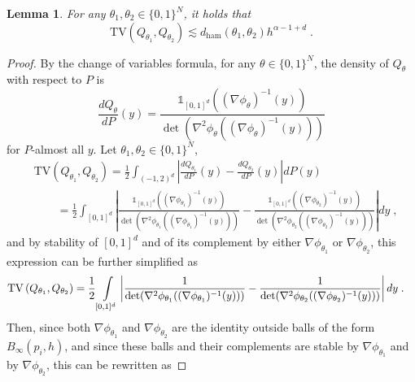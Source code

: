 \documentclass{article}
\theoremstyle{plain}
\newtheorem{lemma}[theorem]{Lemma}
\theoremstyle{definition}
\theoremstyle{remark}
\newcommand{\Ind}[0]{\mathds{1}}
\newcommand\tv[2]{\mathrm{TV}\left( {#1}, {#2} \right)}
\newcommand\ham[2]{d_\mathrm{ham}\left( {#1}, {#2} \right)}
\begin{document}
    \begin{lemma}
    \label{lemma:tvpacking}
    For any $\theta_1, \theta_2 \in \{0, 1 \}^{N}$, it holds that
    \begin{equation}
        \tv{Q_{\theta_1}}{Q_{\theta_2}}
        \lesssim \ham{\theta_1}{\theta_2} h^{\alpha - 1 + d} \;.
    \end{equation}
\end{lemma}
\begin{proof}
By the change of variables formula, for any $\theta \in \{0, 1 \}^{N}$, the density of $Q_{\theta}$  with respect to $P$ is
\begin{equation}
    \frac{d Q_{\theta}}{dP}(y) = \frac{\Ind_{[0, 1]^d} ((\nabla \phi_{\theta})^{-1}(y))}{\det(\nabla^2 \phi_{\theta}((\nabla \phi_{\theta})^{-1}(y)))}
\end{equation}
for $P$-almost all $y$. 
Let $\theta_1, \theta_2\in \{0, 1 \}^{N}$,
\begin{equation}
    \begin{aligned}
        &\tv{Q_{\theta_1}}{Q_{\theta_2}}
        = 
        \frac{1}{2} \int_{(-1,2)^d} \left| \frac{d Q_{\theta_1}}{dP}(y) - \frac{d Q_{\theta_2}}{dP}(y) \right| dP(y) \\
        &\quad\quad= 
        \frac{1}{2} \int_{[0, 1]^d} \left| \frac{\Ind_{[0, 1]^d} ((\nabla \phi_{\theta_1})^{-1}(y))}{\det(\nabla^2 \phi_{\theta_1}((\nabla \phi_{\theta_1})^{-1}(y)))} - \frac{\Ind_{[0, 1]^d} ((\nabla \phi_{\theta_2})^{-1}(y))}{\det(\nabla^2 \phi_{\theta_2}((\nabla \phi_{\theta_2})^{-1}(y)))} \right| dy \;,
    \end{aligned}
\end{equation}
and by stability of $[0, 1]^d$ and of its complement by either $\nabla \phi_{\theta_1}$ or $\nabla \phi_{\theta_2}$, this expression can be further simplified as 
\begin{equation}
    \begin{aligned}
        &\tv{Q_{\theta_1}}{Q_{\theta_2}} 
        = \frac{1}{2} \int \displaylimits_{[0, 1]^d} \left| \frac{1}{\det(\nabla^2 \phi_{\theta_1}((\nabla \phi_{\theta_1})^{-1}(y)))} - \frac{1}{\det(\nabla^2 \phi_{\theta_2}((\nabla \phi_{\theta_2})^{-1}(y)))} \right| dy \;.
    \end{aligned}
\end{equation}
Then, since both $\nabla \phi_{\theta_1}$ and $\nabla \phi_{\theta_2}$ are the identity outside balls of the form $B_{\infty}(p_i, h)$, and since these balls and their complements are stable by $\nabla \phi_{\theta_1}$ and by $\nabla \phi_{\theta_2}$, this can be rewritten as

\end{proof}
\end{document}
